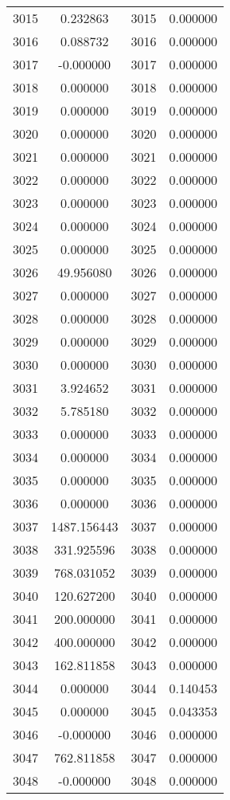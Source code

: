 \documentclass[12pt]{article}
\begin{document}
\begin{longtable}{@{}cccc@{}}
3015 & 0.232863 & 3015 & 0.000000 \\
3016 & 0.088732 & 3016 & 0.000000 \\
3017 & -0.000000 & 3017 & 0.000000 \\
3018 & 0.000000 & 3018 & 0.000000 \\
3019 & 0.000000 & 3019 & 0.000000 \\
3020 & 0.000000 & 3020 & 0.000000 \\
3021 & 0.000000 & 3021 & 0.000000 \\
3022 & 0.000000 & 3022 & 0.000000 \\
3023 & 0.000000 & 3023 & 0.000000 \\
3024 & 0.000000 & 3024 & 0.000000 \\
3025 & 0.000000 & 3025 & 0.000000 \\
3026 & 49.956080 & 3026 & 0.000000 \\
3027 & 0.000000 & 3027 & 0.000000 \\
3028 & 0.000000 & 3028 & 0.000000 \\
3029 & 0.000000 & 3029 & 0.000000 \\
3030 & 0.000000 & 3030 & 0.000000 \\
3031 & 3.924652 & 3031 & 0.000000 \\
3032 & 5.785180 & 3032 & 0.000000 \\
3033 & 0.000000 & 3033 & 0.000000 \\
3034 & 0.000000 & 3034 & 0.000000 \\
3035 & 0.000000 & 3035 & 0.000000 \\
3036 & 0.000000 & 3036 & 0.000000 \\
3037 & 1487.156443 & 3037 & 0.000000 \\
3038 & 331.925596 & 3038 & 0.000000 \\
3039 & 768.031052 & 3039 & 0.000000 \\
3040 & 120.627200 & 3040 & 0.000000 \\
3041 & 200.000000 & 3041 & 0.000000 \\
3042 & 400.000000 & 3042 & 0.000000 \\
3043 & 162.811858 & 3043 & 0.000000 \\
3044 & 0.000000 & 3044 & 0.140453 \\
3045 & 0.000000 & 3045 & 0.043353 \\
3046 & -0.000000 & 3046 & 0.000000 \\
3047 & 762.811858 & 3047 & 0.000000 \\
3048 & -0.000000 & 3048 & 0.000000 \\

\end{longtable}
\end{document}
